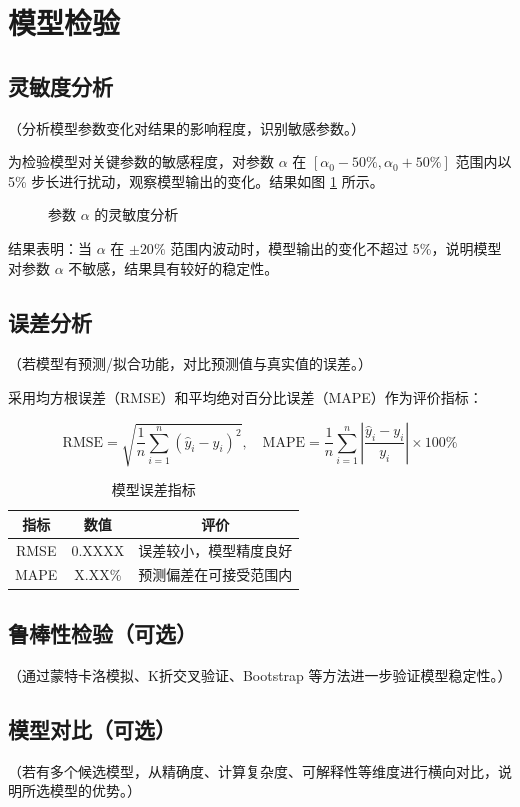 \section{模型检验}

\subsection{灵敏度分析}

（分析模型参数变化对结果的影响程度，识别敏感参数。）

为检验模型对关键参数的敏感程度，对参数 $\alpha$ 在 $[\alpha_0 - 50\%, \alpha_0 + 50\%]$ 范围内以 5\% 步长进行扰动，观察模型输出的变化。结果如图 \ref{fig:sensitivity} 所示。

\begin{figure}[H]
    \centering
    \caption{参数 $\alpha$ 的灵敏度分析}
    \label{fig:sensitivity}
\end{figure}

结果表明：当 $\alpha$ 在 $\pm 20\%$ 范围内波动时，模型输出的变化不超过 5\%，说明模型对参数 $\alpha$ 不敏感，结果具有较好的稳定性。

\subsection{误差分析}

（若模型有预测/拟合功能，对比预测值与真实值的误差。）

采用均方根误差（RMSE）和平均绝对百分比误差（MAPE）作为评价指标：

\begin{equation}
    \text{RMSE} = \sqrt{\frac{1}{n}\sum_{i=1}^{n}(\hat{y}_i - y_i)^2},\quad
    \text{MAPE} = \frac{1}{n}\sum_{i=1}^{n}\left|\frac{\hat{y}_i - y_i}{y_i}\right| \times 100\%
    \label{eq:rmse_mape}
\end{equation}

\begin{table}[H]
    \centering
    \caption{模型误差指标}
    \label{tab:error}
    \begin{tabular}{ccc}
        \toprule
        指标 & 数值 & 评价 \\
        \midrule
        RMSE  & 0.XXXX & 误差较小，模型精度良好 \\
        MAPE  & X.XX\% & 预测偏差在可接受范围内 \\
        \bottomrule
    \end{tabular}
\end{table}

\subsection{鲁棒性检验（可选）}

（通过蒙特卡洛模拟、K折交叉验证、Bootstrap 等方法进一步验证模型稳定性。）

\subsection{模型对比（可选）}

（若有多个候选模型，从精确度、计算复杂度、可解释性等维度进行横向对比，说明所选模型的优势。）
